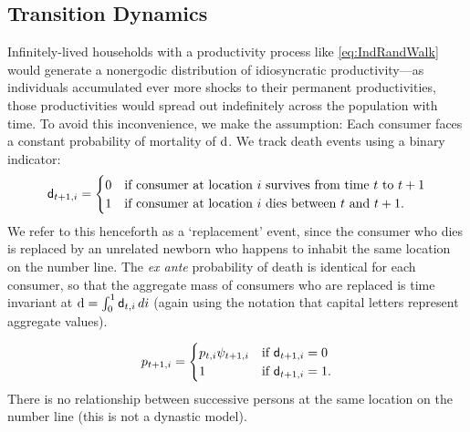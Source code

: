 \documentclass[titlepage]{./econtex}
\begin{document}
\subsection{Transition Dynamics}

Infinitely-lived households with a productivity process like \eqref{eq:IndRandWalk} would generate a nonergodic distribution of idiosyncratic productivity---as individuals accumulated ever more shocks to their permanent productivities, those productivities would spread out indefinitely across the population with time. To avoid this inconvenience, we make the \cite{blanchardFinite} assumption: Each consumer faces a constant probability of mortality of $\mathrm{d}$. We track death events using a binary indicator:
\begin{equation*}
\mathsf{d}_{t+1,i} =
  \begin{cases}
    0 & \text{if consumer at location $i$ survives from time $t$ to $t+1$}
\\    1 & \text{if consumer at location $i$ dies between $t$ and $t+1$}.
  \end{cases}
\end{equation*}
We refer to this henceforth as a `replacement' event, since the consumer who dies is replaced by an unrelated newborn who happens to inhabit the same location on the number line.  The {\it ex ante} probability of death is identical for each consumer, so that the aggregate mass of consumers who are replaced is time invariant at $\mathrm{d} = \int_{0}^{1} \mathsf{d}_{t,i}\,di$ (again using the notation that capital letters represent aggregate values).

\begin{equation*}  
{p}_{t+1,i} =
  \begin{cases}
       {p}_{t,i} \psi_{t+1,i} & \text{if } \mathsf{d}_{t+1,i} = 0 \\
    1 & \text{if } \mathsf{d}_{t+1,i} = 1. \\
  \end{cases}
\end{equation*}
 There is no relationship between successive persons at the same location on the number line (this is not a dynastic model).
\end{document}
